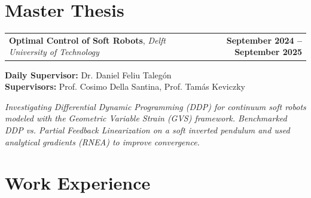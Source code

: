\documentclass[a4paper,20pt]{article}
\makeatletter
\newcommand{\resumeSubheadingEd}[4]{
  \vspace{-1pt}\item
    \begin{tabular*}{0.97\textwidth}{l@{\extracolsep{\fill}}r}
      \textbf{#1} & #2 \\
      #3  & #4 \\
    \end{tabular*}\vspace{-5pt}
}
\newcommand{\resumeSubheadingNew}[6]{ %
 \item
    \begin{tabular*}{1\textwidth}{l@{\extracolsep{\fill}}r}
      \textbf{#1}, \small \textit{#3} \small #4 & #2 \\
    \end{tabular*} 
    \small \textbf{Daily Supervisor:} #5 \\
    \small \textbf{Supervisors:} #6
}
\makeatother
\begin{document}

    
 \vspace{5pt}

\section{Master Thesis}
\resumeSubheadingNew
  {Optimal Control of Soft Robots}{\textbf{September 2024 – September 2025}}
  {Delft University of Technology}{\href{https://repository.tudelft.nl/record/uuid:cc50c41d-1f8d-4328-adda-f1b2e3117635}{\faExternalLink}} %
  {Dr. Daniel Feliu Talegón}
  {Prof. Cosimo Della Santina, Prof. Tamás Keviczky}
\vspace{2}

\textit{Investigating Differential Dynamic Programming (DDP) for continuum soft robots modeled with the Geometric Variable Strain (GVS) framework. Benchmarked DDP vs. Partial Feedback Linearization on a soft inverted pendulum and used analytical gradients (RNEA) to improve convergence.}

\vspace{-5pt}
\section{Work Experience}
\end{document}

